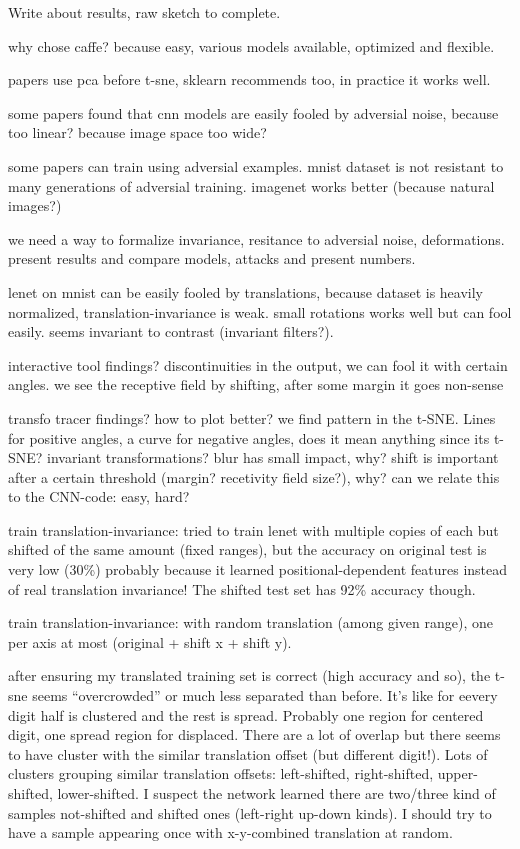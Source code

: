 \documentclass[a4paper,12pt]{article}
\begin{document}
Write about results, raw sketch to complete.

why chose caffe? because easy, various models available, optimized and flexible.

papers use pca before t-sne, sklearn recommends too, in practice it works well.

some papers found that cnn models are easily fooled by adversial noise, because too linear? because image space too wide?

some papers can train using adversial examples. mnist dataset is not resistant to many generations of adversial training. imagenet works better (because natural images?)

we need a way to formalize invariance, resitance to adversial noise, deformations. present results and compare models, attacks and present numbers.

lenet on mnist can be easily fooled by translations, because dataset is heavily normalized, translation-invariance is weak. small rotations works well but can fool easily. seems invariant to contrast (invariant filters?).

interactive tool findings? discontinuities in the output, we can fool it with certain angles. we see the receptive field by shifting, after some margin it goes non-sense

transfo tracer findings? how to plot better? we find pattern in the t-SNE. Lines for positive angles, a curve for negative angles, does it mean anything since its t-SNE? invariant transformations? blur has small impact, why? shift is important after a certain threshold (margin? recetivity field size?), why? can we relate this to the CNN-code: easy, hard?

train translation-invariance: tried to train lenet with multiple copies of each but shifted of the same amount (fixed ranges), but the accuracy on original test is very low (30\%) probably because it learned positional-dependent features instead of real translation invariance! The shifted test set has 92\% accuracy though.

train translation-invariance: with random translation (among given range), one per axis at most (original + shift x + shift y).

after ensuring my translated training set is correct (high accuracy and so), the t-sne seems ``overcrowded'' or much less separated than before. It's like for eevery digit half is clustered and the rest is spread. Probably one region for centered digit, one spread region for displaced. There are a lot of overlap but there seems to have cluster with the similar translation offset (but different digit!). Lots of clusters grouping similar translation offsets: left-shifted, right-shifted, upper-shifted, lower-shifted. I suspect the network learned there are two/three kind of samples not-shifted and shifted ones (left-right up-down kinds). I should try to have a sample appearing once with x-y-combined translation at random.
\end{document}
